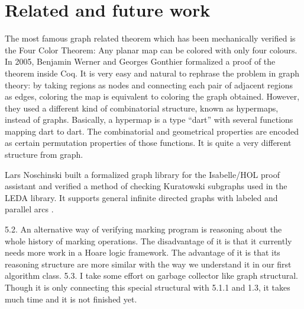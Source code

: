 \section{Related and future work}

The most famous graph related theorem which has been mechanically
verified is the Four Color Theorem: Any planar map can be colored with
only four colours. In 2005, Benjamin Werner and Georges Gonthier
formalized a proof of the theorem \cite{gonthier2005computer} inside
Coq. It is very easy and natural to rephrase the problem in graph
theory: by taking regions as nodes and connecting each pair of
adjacent regions as edges, coloring the map is equivalent to coloring
the graph obtained. However, they used a different kind of
combinatorial structure, known as hypermaps, instead of
graphs. Basically, a hypermap is a type ``dart'' with several
functions mapping dart to dart. The combinatorial and geometrical
properties are encoded as certain permutation properties of those
functions. It is quite a very different structure from graph.

Lars Noschinski built a formalized graph library for the Isabelle/HOL
proof assistant and verified a method of checking Kuratowski subgraphs
used in the LEDA library. It supports general infinite directed graphs
with labeled and parallel arcs \cite{Noschinski2015}.

5.2. An alternative way of verifying marking program is reasoning about the whole history of marking operations. The disadvantage of it is that it currently needs more work in a Hoare logic framework. The advantage of it is that its reasoning structure are more similar with the way we understand it in our first algorithm class.
5.3. I take some effort on garbage collector like graph structural. Though it is only connecting this special structural with 5.1.1 and 1.3, it takes much time and it is not finished yet.

